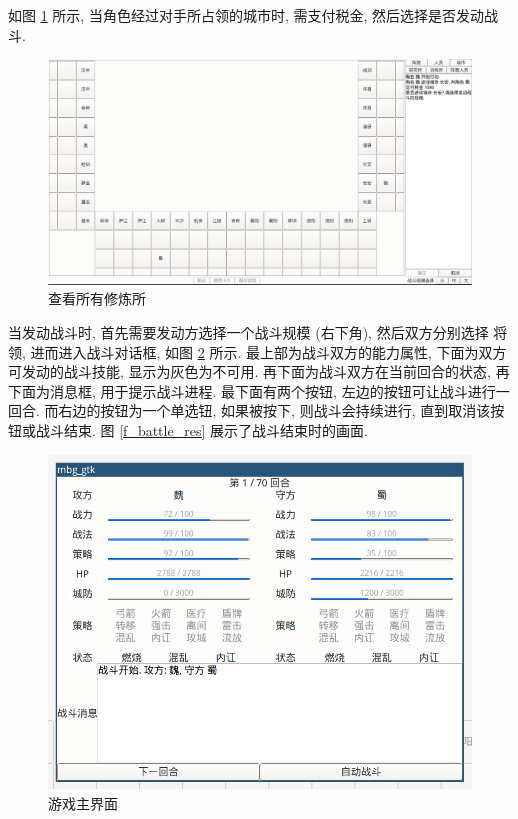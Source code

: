 \documentclass[UTF8, zihao=-4]{ctexart} %
\begin{document}
如图 \ref{f_cross_city} 所示, 当角色经过对手所占领的城市时, 需支付税金,
然后选择是否发动战斗. 
\begin{figure}
    \centering
    \includegraphics[width=\textwidth]{f_cross_city.png}
    \caption{\label{f_cross_city}查看所有修炼所}
\end{figure}
当发动战斗时, 首先需要发动方选择一个战斗规模 (右下角), 然后双方分别选择
将领, 进而进入战斗对话框, 如图 \ref{f_battle} 所示.
最上部为战斗双方的能力属性, 下面为双方可发动的战斗技能, 显示为灰色为不可用.
再下面为战斗双方在当前回合的状态, 再下面为消息框, 用于提示战斗进程.
最下面有两个按钮, 左边的按钮可让战斗进行一回合. 而右边的按钮为一个单选钮, 
如果被按下, 则战斗会持续进行, 直到取消该按钮或战斗结束. 图 \ref{f_battle_res}
展示了战斗结束时的画面.
\begin{figure}
    \centering
    \includegraphics[scale=0.4]{f_battle.png}
    \caption{\label{f_battle}游戏主界面}
\end{figure}
\end{document}
